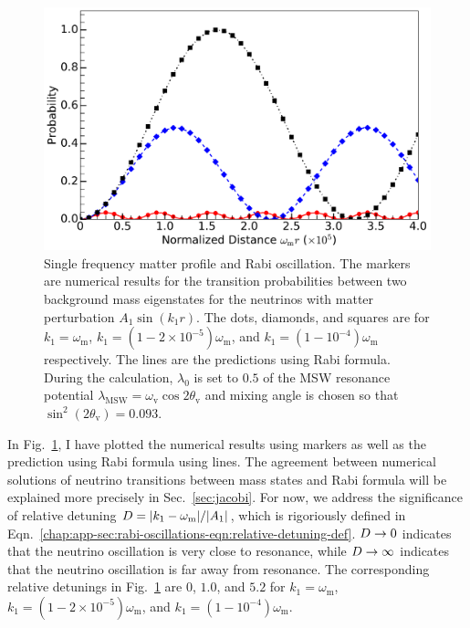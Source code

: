 \begin{figure}[h!tbp]
                \includegraphics[width=\columnwidth]{chapters/assets/rabi/rabiOscillationsNeutrinoCoincidence-single-frequency}
                \caption{Single frequency matter profile and Rabi oscillation. The markers are numerical results for the transition probabilities between two background mass eigenstates for the neutrinos with matter perturbation $A_1\sin(k_1 r)$. The dots, diamonds, and squares are for $k_1=\omega_{\mathrm m}$, $k_1=(1-2\times 10^{-5})\omega_{\mathrm m}$, and $k_1=(1-10^{-4})\omega_{\mathrm m}$ respectively. The lines are the predictions using Rabi formula. During the calculation, $\lambda_0$ is set to $0.5$ of the MSW resonance potential $\lambda_{\mathrm{MSW}}=\omega_{\mathrm{v}}\cos 2\theta_{\mathrm v}$ and mixing angle is chosen so that $\sin^2(2\theta_{\mathrm v}) = 0.093$.}
                \label{fig-rabiOscillationsNeutrinoCoincidence}
\end{figure}

In Fig.~\ref{fig-rabiOscillationsNeutrinoCoincidence}, I have plotted the numerical results using markers as well as the prediction using Rabi formula using lines. The agreement between numerical solutions of neutrino transitions between mass states and Rabi formula will be explained more precisely in Sec.~\ref{sec:jacobi}. For now, we address the significance of relative detuning $D = \lvert k_1 - \omega_{\mathrm m} \rvert /\lvert A_1 \rvert$,  which is rigoriously defined in Eqn.~\ref{chap:app-sec:rabi-oscillations-eqn:relative-detuning-def}. $D\to 0$ indicates that the neutrino oscillation is very close to resonance, while $D\to \infty$ indicates that the neutrino oscillation is far away from resonance. The corresponding relative detunings in Fig.~\ref{fig-rabiOscillationsNeutrinoCoincidence} are $0$, $1.0$, and $5.2$ for $k_1=\omega_{\mathrm{m}}$, $k_1=(1-2\times 10^{-5})\omega_{\mathrm m}$, and $k_1=(1-10^{-4})\omega_{\mathrm m}$.

